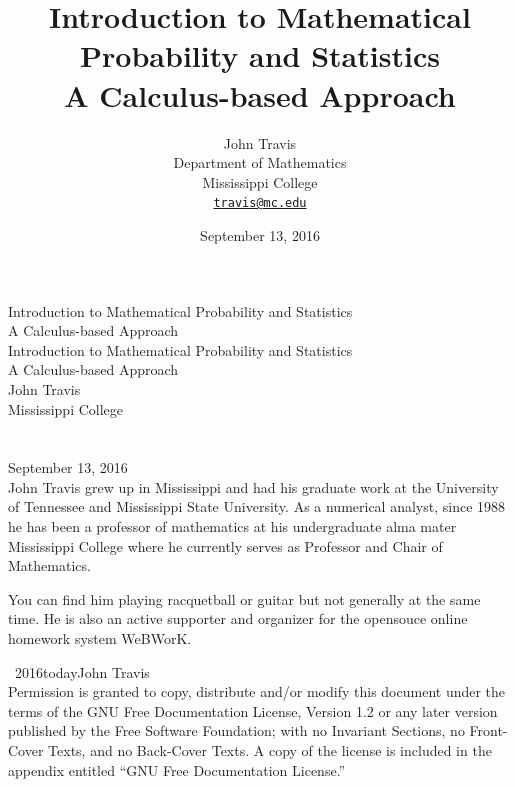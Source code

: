 \documentclass[10pt,]{book}
\title{Introduction to Mathematical Probability and Statistics\\
{\large A Calculus-based Approach}}
\author{John Travis\\
Department of Mathematics\\
Mississippi College\\
\href{mailto:travis@mc.edu}{\nolinkurl{travis@mc.edu}}
}
\date{September 13, 2016}
\theoremstyle{plain}
\theoremstyle{definition}
\theoremstyle{definition}
\theoremstyle{definition}
\numberwithin{equation}{section}
\begin{document}
\frontmatter
\thispagestyle{empty}
{\centering
\vspace*{0.28\textheight}
{\Huge Introduction to Mathematical Probability and Statistics}\\[2\baselineskip]
{\LARGE A Calculus-based Approach}\\
}
\clearpage
\thispagestyle{empty}
\null%
\clearpage
\thispagestyle{empty}
{\centering
\vspace*{0.14\textheight}
{\Huge Introduction to Mathematical Probability and Statistics}\\[\baselineskip]
{\LARGE A Calculus-based Approach}\\[3\baselineskip]
{\Large John Travis}\\[0.5\baselineskip]
{\Large Mississippi College}\\[3\baselineskip]
{\Large }\\[0.5\baselineskip]
{\normalsize }\\[3\baselineskip]
{\Large September 13, 2016}\\}
\clearpage
\thispagestyle{empty}
\noindent
John Travis grew up in Mississippi and had his graduate work at the University of Tennessee and Mississippi State University. As a numerical analyst, since 1988 he has been a professor of mathematics at his undergraduate alma mater Mississippi College where he currently serves as Professor and Chair of Mathematics.%
\par
You can find him playing racquetball or guitar but not generally at the same time. He is also an active supporter and organizer for the opensouce online homework system WeBWorK.%
\par
{}
\noindent\textcopyright\ 2016\textendash{}today\quad{}John Travis\\[0.5\baselineskip]
Permission is granted to copy, distribute and/or modify this document under the terms of the GNU Free Documentation License, Version 1.2 or any later version published by the Free Software Foundation; with no Invariant Sections, no Front-Cover Texts, and no Back-Cover Texts.  A copy of the license is included in the appendix entitled ``GNU Free Documentation License.''\par
{}
\null\clearpage
\end{document}

